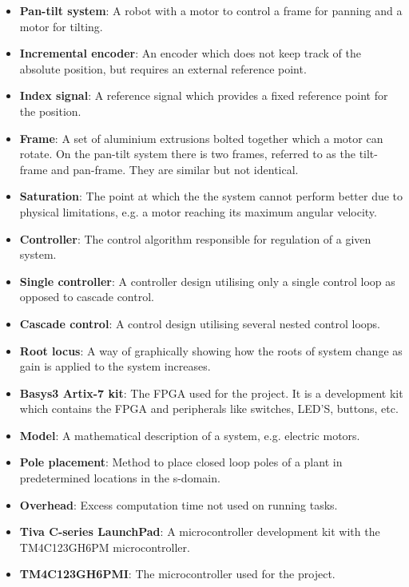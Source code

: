 \documentclass[../../main.tex]{subfiles}
\begin{document}
\label{sec:wordlist}
\begin{itemize}
    \item \textbf{Pan-tilt system}: A robot with a motor to control a frame for panning and a motor for tilting.
    \item \textbf{Incremental encoder}: An encoder which does not keep track of the absolute position, but requires an external reference point.
    \item \textbf{Index signal}: A reference signal which provides a fixed reference point for the position.
    \item \textbf{Frame}: A set of aluminium extrusions bolted together which a motor can rotate. On the pan-tilt system there is two frames, referred to as the tilt-frame and pan-frame. They are similar but not identical.
    \item \textbf{Saturation}: The point at which the the system cannot perform better due to physical limitations, e.g. a motor reaching its maximum angular velocity.
    \item \textbf{Controller}: The control algorithm responsible for regulation of a given system.
    \item \textbf{Single controller}: A controller design utilising only a single control loop as opposed to cascade control.
    \item \textbf{Cascade control}: A control design utilising several nested control loops.
    \item \textbf{Root locus}: A way of graphically showing how the roots of system change as gain is applied to the system increases.
    \item \textbf{Basys3 Artix-7 kit}: The FPGA used for the project. It is a development kit which contains the FPGA and peripherals like switches, LED'S, buttons, etc.
    \item \textbf{Model}: A mathematical description of a system, e.g. electric motors. 
    \item \textbf{Pole placement}: Method to place closed loop poles of a plant in predetermined locations in the s-domain.
    \item \textbf{Overhead}: Excess computation time not used on running tasks.
    \item \textbf{Tiva C-series LaunchPad}: A microcontroller development kit with the TM4C123GH6PM microcontroller.
    \item \textbf{TM4C123GH6PMI}: The microcontroller used for the project.
    

\end{itemize}
\end{document}
